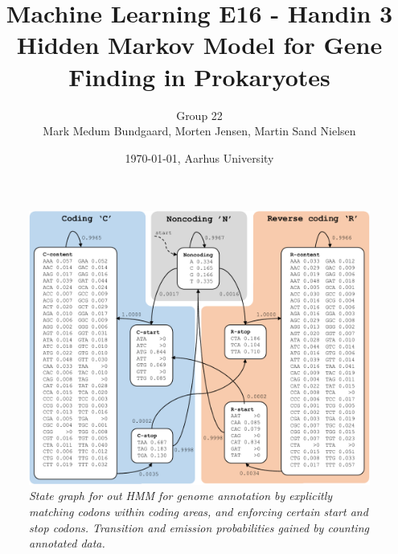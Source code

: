 \documentclass[a4paper,10pt,article,oneside,english]{memoir}
\let\oldcaption\caption
\renewcommand{\caption}[1]{\oldcaption{\emph{#1}}}
\begin{document}
	\title{Machine Learning E16 - Handin 3\\
		 Hidden Markov Model for Gene Finding in Prokaryotes}
	\author{Group 22\\
		Mark Medum Bundgaard, Morten Jensen, Martin Sand Nielsen}
	\date{\today, Aarhus University}
	
	\mainmatter
	\maketitle
	
\begin{figure}
	\centering
	\includegraphics[width=\linewidth]{HMM_graph_cropped.pdf}
	\caption{State graph for out HMM for genome annotation by explicitly matching codons within coding areas, and enforcing certain start and stop codons. Transition and emission probabilities gained by counting annotated data.}
	\label{fig:hmm_graph}
\end{figure}
	
	
\end{document}
